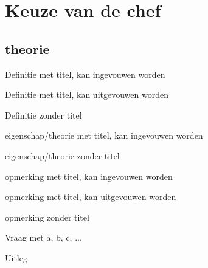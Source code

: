 \documentclass{ximera}
\begin{document}
\section{Keuze van de chef}
\subsection{theorie}
\begin{definition}[foldable=true,title={Titel van definitie}]\nl
Definitie met titel, kan ingevouwen worden
\end{definition}
\begin{definition}[expandable=true,title={Titel van definitie}]\nl
Definitie met titel, kan uitgevouwen worden
\end{definition}

\begin{definition}
Definitie zonder titel
\end{definition}

\begin{proposition}[foldable=true,title={Titel van eigenschap}]\nl
eigenschap/theorie met titel, kan ingevouwen worden
\end{proposition}

\begin{proposition}
eigenschap/theorie zonder titel
\end{proposition}

\begin{remark}[foldable=true,title={Titel van opmerking}]\nl
opmerking met titel, kan ingevouwen worden
\end{remark}

\begin{remark}[expandable=true,title={Titel van opmerking}]\nl
opmerking met titel, kan uitgevouwen worden
\end{remark}

\begin{remark}
opmerking zonder titel
\end{remark}

\begin{question}
	Vraag met a, b, c, ...
	\begin{selectAll}
	\end{selectAll}

	\begin{solution}
		Uitleg
	\end{solution}
\end{question}
\end{document}
